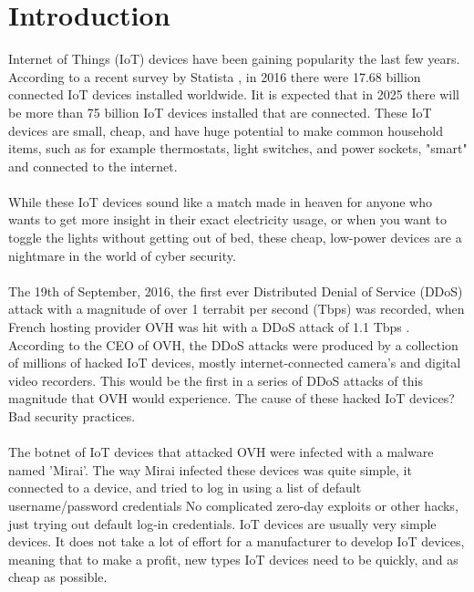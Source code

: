 \documentclass[a4paper,10pt]{article}
\begin{document}
\section{Introduction} \label{sec:introduction}
Internet of Things (IoT) devices have been gaining popularity the last few years. According to a recent survey by Statista 
\cite{amount_iot_devices}, in 2016 there were 17.68 billion connected IoT devices installed worldwide. Iit is expected that in 2025 
there will be more than 75 billion IoT devices installed that are connected. These IoT devices are small, cheap, and have
huge potential to make common household items, such as for example thermostats, light switches, and power sockets, 
"smart" and connected to the internet.
\\\\
While these IoT devices sound like a match made in heaven for anyone who wants to get more insight in their exact 
electricity usage, or when you want to toggle the lights without getting out of bed, these cheap, low-power devices  are 
a nightmare in the world of cyber security.
\\\\
The 19th of September, 2016, the first ever Distributed Denial of Service (DDoS) attack with a magnitude of over 1 terrabit
per second (Tbps) was recorded, when French hosting provider OVH was hit with a DDoS attack of 1.1 Tbps \cite{ovh}. 
According to the CEO of OVH, the DDoS attacks were produced by a collection of millions of hacked IoT devices, mostly
internet-connected camera's and digital video recorders. This would be the first in a series of DDoS attacks of this 
magnitude that OVH would experience. The cause of these hacked IoT devices? Bad security practices.
\\\\
The botnet of IoT devices that attacked OVH were infected with a malware named 'Mirai'. The way Mirai infected these
devices was quite simple, it connected to a device, and tried to log in using a list of default username/password credentials
\cite{how_mirai_works} No complicated zero-day exploits or other hacks, just trying out default log-in credentials. IoT 
devices are usually very  simple devices. It does not take a lot of effort for a manufacturer to develop IoT devices, 
meaning that to make a profit, new types IoT devices need to be quickly, and as cheap as possible. 
\\\\
\end{document}

